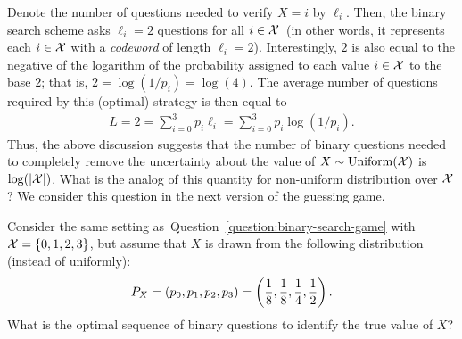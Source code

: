 \documentclass[12pt]{article}
\begin{document}
        Denote the number of questions needed to verify $X=i$ by $\ell_i$. Then, the binary search scheme asks $\ell_i=2$ questions for all $i \in \mathcal{X}$~(in other words, it represents each $i \in \mathcal{X}$ with a \emph{codeword} of length $\ell_i=2$). Interestingly, $2$ is also equal to  the negative of the logarithm of the probability assigned to each value $i \in \mathcal{X}$ to the base $2$; that is, $2 = \log(1/p_i) = \log(4)$. The average number of questions required by this (optimal) strategy is then equal to
        \begin{align}
            L = 2 = \sum_{i=0}^{3} p_i \ell_i = \sum_{i=0}^3 p_i \log (1/p_i). 
        \end{align}
        Thus, the above discussion suggests that the number of binary questions needed to completely remove the uncertainty about the value of $X \sim \mathrm{Uniform}(\mathcal{X})$ is $\log(|\mathcal{X}|)$. What is the analog of this quantity for  non-uniform distribution over $\mathcal{X}$? We consider this question in the next version of the guessing game. 
% 
        \begin{question} 
            \label{question:guessing-game-II}
            Consider the same setting as~Question~\ref{question:binary-search-game} with $\mathcal{X} = \{0, 1, 2, 3\}$, but assume that $X$ is drawn from the following distribution (instead of uniformly): 
            \begin{align}
                P_X = (p_0, p_1, p_2, p_3) = \left( \frac{1}{8}, \frac{1}{8}, \frac{1}{4}, \frac{1}{2} \right). 
            \end{align}
            What is the optimal sequence of binary questions to identify the true value of $X$? 
        \end{question}
\end{document}
